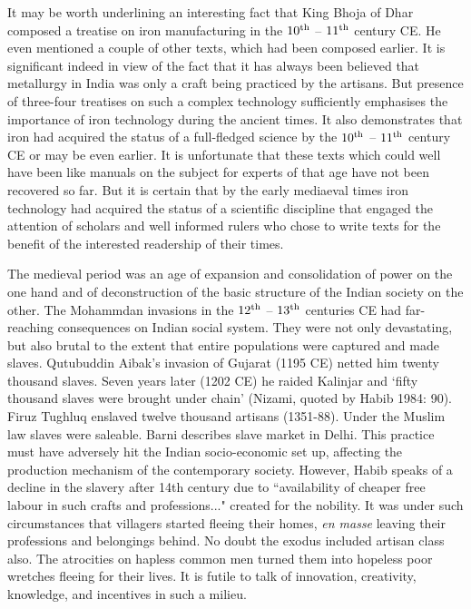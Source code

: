 It may be worth underlining an interesting fact that King Bhoja of Dhar composed a treatise on iron manufacturing in the $10^{\rm th}$ – $11^{\rm th}$ century CE. He even mentioned a couple of other texts, which had been composed earlier. It is significant indeed in view of the fact that it has always been believed that metallurgy in India was only a craft being practiced by the artisans. But presence of three-four treatises on such a complex technology sufficiently emphasises the importance of iron technology during the ancient times. It also demonstrates that iron had acquired the status of a full-fledged science by the $10^{\rm th}$ – $11^{\rm th}$ century CE or may be even earlier. It is unfortunate that these texts which could well have been like manuals on the subject for experts of that age have not been recovered so far. But it is certain that by the early mediaeval times iron technology had acquired the status of a scientific discipline that engaged the attention of scholars and well informed rulers who chose to write texts for the benefit of the interested readership of their times.

The medieval period was an age of expansion and consolidation of power on the one hand and of deconstruction of the basic structure of the Indian society on the other. The Mohammdan invasions in the $12^{\rm th}$ – $13^{\rm th}$ centuries CE had far-reaching consequences on Indian social system. They were not only devastating, but also brutal to the extent that entire populations were captured and made slaves. Qutubuddin Aibak's invasion of Gujarat (1195 CE) netted him twenty thousand slaves. Seven years later (1202 CE) he raided Kalinjar and ‘fifty thousand slaves were brought under chain' (Nizami, quoted by Habib 1984: 90). Firuz Tughluq enslaved twelve thousand artisans (1351-88). Under the Muslim law slaves were saleable. Barni describes slave market in Delhi. This practice must have adversely hit the Indian socio-economic set up, affecting the production mechanism of the contemporary society. However, Habib speaks of a decline in the slavery after 14th century due to ``availability of cheaper free labour in such crafts and professions..." created for the nobility. It was under such circumstances that villagers started fleeing their homes, \textit{en masse} leaving their professions and belongings behind. No doubt the exodus included artisan class also. The atrocities on hapless common men turned them into hopeless poor wretches fleeing for their lives. It is futile to talk of innovation, creativity, knowledge, and incentives in such a milieu. 

